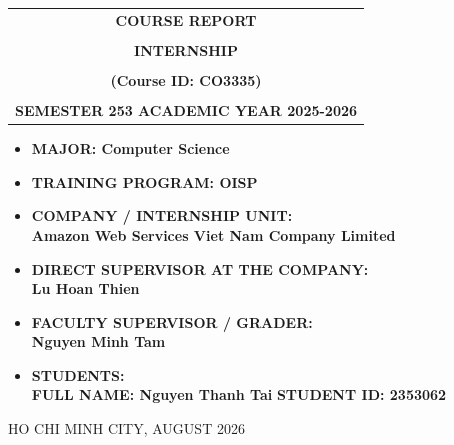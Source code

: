 \documentclass[a4paper,12pt]{article}
\newcommand{\cover}{\fontsize{15}{18}\selectfont}
\newcommand{\coverbig}{\fontsize{18}{22}\selectfont}
\newcommand{\coverlistspacing}{\setlength{\itemsep}{2pt}\setlength{\parskip}{0pt}\setlength{\parsep}{0pt}\setlength{\topsep}{0pt}}
\begin{document}
\begin{titlepage}
\begin{center}
\begin{tabular}{c}
\multicolumn{1}{c}{\textbf{{\coverbig COURSE REPORT}}}\\
\\{\textbf{{\coverbig INTERNSHIP}}}\\
\\{\textbf{{\coverbig (Course ID: CO3335)}}}
\\
\\
\textbf{\cover SEMESTER 253 ACADEMIC YEAR 2025-2026} \\
\end{tabular}
\end{center}
\vspace{0.2cm}
\begin{itemize}
\renewcommand\labelitemi{--}
\coverlistspacing
    \item \cover \textbf{MAJOR: Computer Science}
    \item \cover \textbf{TRAINING PROGRAM: OISP}
\end{itemize}
\vspace{0.35cm}
\begin{itemize}
\renewcommand\labelitemi{--}
\coverlistspacing
    \item \cover \textbf{COMPANY / INTERNSHIP UNIT:}
    \\ \cover \textbf{Amazon Web Services Viet Nam Company Limited}
    \item \cover \textbf{DIRECT SUPERVISOR AT THE COMPANY:}
    \\ \cover \textbf{Lu Hoan Thien}
    \item \cover \textbf{FACULTY SUPERVISOR / GRADER:}
    \\ \cover \textbf{Nguyen Minh Tam}
    \item \cover \textbf{STUDENTS:}
    \\ \cover \textbf{FULL NAME: Nguyen Thanh Tai} \textbf{STUDENT ID: 2353062}
\end{itemize}
\enlargethispage{1.3cm}
\vfill
\begin{center}
{\cover HO CHI MINH CITY, AUGUST 2026}
\end{center}
\vspace{0.5cm}
\end{titlepage}

\newpage
\tableofcontents
\newpage
\end{document}

